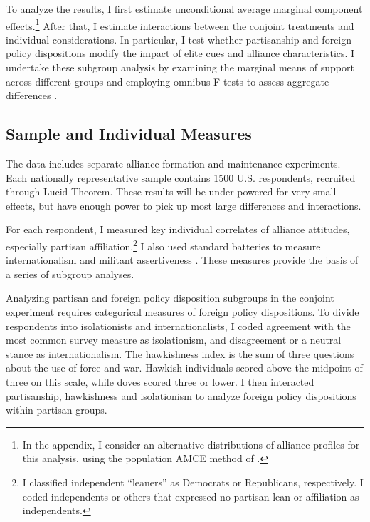 \documentclass[12pt]{article}
\begin{document}
To analyze the results, I first estimate unconditional average marginal component effects.\footnote{In the appendix, I consider an alternative distributions of alliance profiles for this analysis, using the population AMCE method of \citet{delaCuestaetal2021}.}
After that, I estimate interactions between the conjoint treatments and individual considerations.
In particular, I test whether partisanship and foreign policy dispositions modify the impact of elite cues and alliance characteristics. 
I undertake these subgroup analysis by examining the marginal means of support across different groups and employing omnibus F-tests to assess aggregate differences \citep{Leeperetal2020}. 



\subsection{Sample and Individual Measures}


The data includes separate alliance formation and maintenance experiments. 
Each nationally representative sample contains 1500 U.S. respondents, recruited through Lucid Theorem.
These results will be under powered for very small effects, but have enough power to pick up most large differences and interactions. 


For each respondent, I measured key individual correlates of alliance attitudes, especially partisan affiliation.\footnote{I classified independent ``leaners'' as Democrats or Republicans, respectively. I coded independents or others that expressed no partisan lean or affiliation as independents.}
I also used standard batteries to measure internationalism and militant assertiveness \citep{Herrmannetal1999, KertzerBrutger2016}.
These measures provide the basis of a series of subgroup analyses. 


Analyzing partisan and foreign policy disposition subgroups in the conjoint experiment requires categorical measures of foreign policy dispositions. 
To divide respondents into isolationists and internationalists, I coded agreement with the most common survey measure as isolationism, and disagreement or a neutral stance as internationalism. 
The hawkishness index is the sum of three questions about the use of force and war. 
Hawkish individuals scored above the midpoint of three on this scale, while doves scored three or lower. 
I then interacted partisanship, hawkishness and isolationism to analyze foreign policy dispositions within partisan groups.
\end{document}
